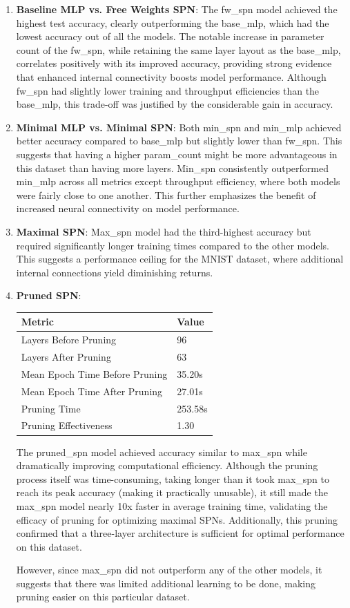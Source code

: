 \begin{enumerate}
\item \textbf{Baseline MLP vs. Free Weights SPN}: The fw\_spn model achieved the highest test accuracy, clearly outperforming the base\_mlp, which had the lowest accuracy out of all the models. The notable increase in parameter count of the fw\_spn, while retaining the same layer layout as the base\_mlp, correlates positively with its improved accuracy, providing strong evidence that enhanced internal connectivity boosts model performance. Although fw\_spn had slightly lower training and throughput efficiencies than the base\_mlp, this trade-off was justified by the considerable gain in accuracy.
\item \textbf{Minimal MLP vs. Minimal SPN}: Both min\_spn and min\_mlp achieved better accuracy compared to base\_mlp but slightly lower than fw\_spn. This suggests that having a higher param\_count might be more advantageous in this dataset than having more layers. Min\_spn consistently outperformed min\_mlp across all metrics except throughput efficiency, where both models were fairly close to one another. This further emphasizes the benefit of increased neural connectivity on model performance.
\item \textbf{Maximal SPN}: Max\_spn model had the third-highest accuracy but required significantly longer training times compared to the other models. This suggests a performance ceiling for the MNIST dataset, where additional internal connections yield diminishing returns.
\item \textbf{Pruned SPN}:
\begin{center}  %
\begin{tabular}{|l|l|}
\hline
\textbf{Metric} & \textbf{Value} \\
\hline
Layers Before Pruning & 96 \\
Layers After Pruning & 63 \\
Mean Epoch Time Before Pruning & 35.20s \\
Mean Epoch Time After Pruning & 27.01s \\
Pruning Time & 253.58s \\
Pruning Effectiveness & 1.30 \\
\hline
\end{tabular}
\end{center}
The pruned\_spn model achieved accuracy similar to max\_spn while dramatically improving computational efficiency. Although the pruning process itself was time-consuming, taking longer than it took max\_spn to reach its peak accuracy (making it practically unusable), it still made the max\_spn model nearly 10x faster in average training time, validating the efficacy of pruning for optimizing maximal SPNs. Additionally, this pruning confirmed that a three-layer architecture is sufficient for optimal performance on this dataset. 

However, since max\_spn did not outperform any of the other models, it suggests that there was limited additional learning to be done, making pruning easier on this particular dataset.
\end{enumerate}

